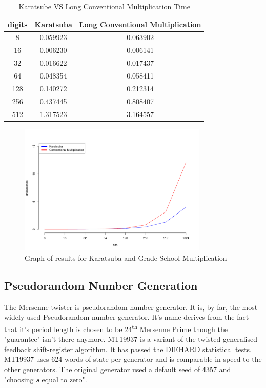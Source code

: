 \documentclass[conference]{IEEEtran}
\begin{document}
\begin{table}[ht]
	\begin{center}
	\begin{tabular}{|c|c|c|}
    	\hline
       		digits 	&		Karatsuba					&	Long Conventional Multiplication\\
	\hline
    		8		&		0.059923					&	0.063902 \\
		16		&		0.006230					&	0.006141 \\
		32		&		0.016622					&	0.017437 \\
		64		&		0.048354					&	0.058411 \\
		128		&		0.140272					&	0.212314 \\
		256		&		0.437445					&	0.808407 \\
		512		&		1.317523					&	3.164557 \\
	\hline
	\end{tabular}
	\end{center}
	\caption{Karatsube VS Long Conventional Multiplication Time}
	\label{table:karatsubaVSgrade}

\end{table}

\begin{figure}[ht!]
\centering
\includegraphics[width=90mm]{images/karatsubaVSgradeSchool.pdf}
\caption{Graph of results for Karatsuba and Grade School Multiplication}
\label{fig:karatsubaVSgrade}
\end{figure}


\subsection{{\large Pseudorandom Number Generation}}
\label{sec:mersenne}
The Mersenne twister\cite{MT19937} is pseudorandom number generator. It is, by far, the most widely used Pseudorandom number generator. It's name derives from the fact that it's period length is chosen to be 24\textsuperscript{th} Mersenne Prime though the "guarantee" isn't there anymore. MT19937 is a variant of the twisted generalised feedback shift-register algorithm. It has passed the DIEHARD statistical tests. MT19937 uses 624 words of state per generator and is comparable in speed to the other generators. The original generator used a default seed of 4357 and "choosing \emph{{\bf s}} equal to zero".\cite{MT19937}
\end{document}
